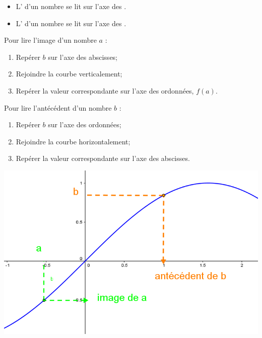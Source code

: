 \documentclass[12pt,a4paper]{article}
\begin{document}
\begin{myprops}
	\begin{itemize}
		\item L' d'un nombre se lit sur l'axe des .
		\item L' d'un nombre se lit sur l'axe des .
	\end{itemize}
\end{myprops}


\begin{mymeth}
	
	\begin{multicols}{2}
		
	
		Pour lire l'image d'un nombre $a$ :
		\begin{enumerate}
			\item Repérer $b$ sur l'axe des abscisses;
			\item Rejoindre la courbe verticalement;
			\item Repérer la valeur correspondante sur l'axe des ordonnées, $f(a)$.
		\end{enumerate}
		
		
		Pour lire l'antécédent d'un nombre $b$ :
		\begin{enumerate}
			\item Repérer $b$ sur l'axe des ordonnées;
			\item Rejoindre la courbe horizontalement;
			\item Repérer la valeur correspondante sur l'axe des abscisses.
		\end{enumerate}
		
		\includegraphics[scale=0.5]{img/graph2}
	\end{multicols}
\end{mymeth}
\end{document}
